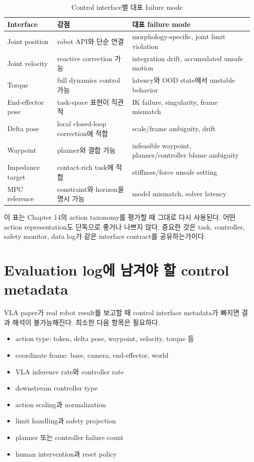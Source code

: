\begin{table}[ht]
\centering
\caption{Control interface별 대표 failure mode}
\label{tab:control-failure}
\small
\begin{tabularx}{\textwidth}{p{28mm}X X}
\toprule
Interface & 강점 & 대표 failure mode \\
\midrule
Joint position & robot API와 단순 연결 & morphology-specific, joint limit violation \\
Joint velocity & reactive correction 가능 & integration drift, accumulated unsafe motion \\
Torque & full dynamics control 가능 & latency와 OOD state에서 unstable behavior \\
End-effector pose & task-space 표현이 직관적 & IK failure, singularity, frame mismatch \\
Delta pose & local closed-loop correction에 적합 & scale/frame ambiguity, drift \\
Waypoint & planner와 결합 가능 & infeasible waypoint, planner/controller blame ambiguity \\
Impedance target & contact-rich task에 적합 & stiffness/force unsafe setting \\
MPC reference & constraint와 horizon을 명시 가능 & model mismatch, solver latency \\
\bottomrule
\end{tabularx}
\end{table}

이 표는 Chapter 14의 action taxonomy를 평가할 때 그대로 다시 사용된다. 어떤 action representation도 단독으로 좋거나 나쁘지 않다. 중요한 것은 task, controller, safety monitor, data log가 같은 interface contract를 공유하는가이다.

\section{Evaluation log에 남겨야 할 control metadata}

VLA paper가 real robot result를 보고할 때 control interface metadata가 빠지면 결과 해석이 불가능해진다. 최소한 다음 항목은 필요하다.

\begin{itemize}
  \item action type: token, delta pose, waypoint, velocity, torque 등
  \item coordinate frame: base, camera, end-effector, world
  \item VLA inference rate와 controller rate
  \item downstream controller type
  \item action scaling과 normalization
  \item limit handling과 safety projection
  \item planner 또는 controller failure count
  \item human intervention과 reset policy
\end{itemize}

